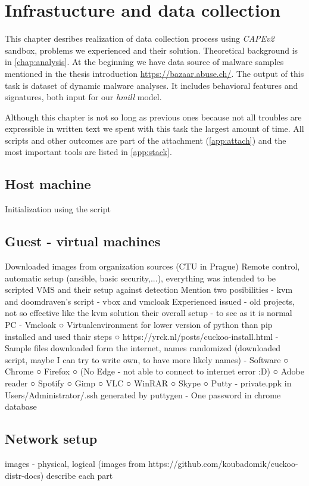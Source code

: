 \chapter{Infrastucture and data collection} \label{chap:infrastructure}
This chapter desribes realization of data collection process using \emph{CAPEv2} sandbox, problems we experienced and their solution. Theoretical background is in \ref{chap:analysis}. At the beginning we have data source of malware samples mentioned in the thesis introduction \url{https://bazaar.abuse.ch/}. The output of this task is dataset of dynamic malware analyses. It includes behavioral features and signatures, both input for our \emph{hmill} model.

Although this chapter is not so long as previous ones because not all troubles are expressible in written text we spent with this task the largest amount of time. All scripts and other outcomes are part of the attachment (\ref{app:attach}) and the most important tools are listed in \ref{app:stack}.

\section{Host machine}
Initialization using the script

\section{Guest - virtual machines}
Downloaded images from organization sources (CTU in Prague)
Remote control, automatic setup (ansible, basic security,...), everything was intended to be scripted
VMS and their setup against detection
Mention two posibilities
    - kvm and doomdraven's script
    - vbox and vmcloak
        Experienced issued - old projects, not so effective like the kvm solution
their overall setup - to see as it is normal PC
    - Vmcloak
    ○ Virtualenvironment for lower version of python than pip installed and used thair steps
    ○ https://yrck.nl/posts/cuckoo-install.html
    - Sample files downloaded form the internet, names randomized (downloaded script, maybe I can try to write own, to have more likely names)
    - Software
    ○ Chrome
    ○ Firefox
    ○ (No Edge - not able to connect to internet error :D)
    ○ Adobe reader
    ○ Spotify
    ○ Gimp
    ○ VLC
    ○ WinRAR
    ○ Skype
    ○ Putty
    - private.ppk in Users/Administrator/.ssh generated by puttygen
    - One password in chrome database

\section{Network setup}
images - physical, logical (images from https://github.com/koubadomik/cuckoo-distr-docs)
describe each part

